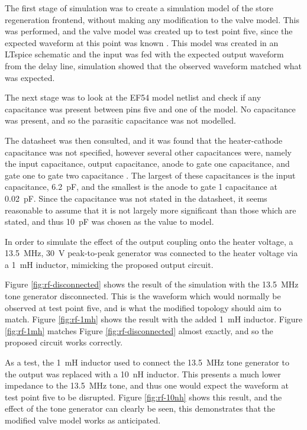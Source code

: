 The first stage of simulation was to create a simulation model of the store regeneration frontend, without making any modification to the valve model. This was performed, and the valve model was created up to test point five, since the expected waveform at this point was known \cite[p.3]{linnington2016b}. This model was created in an LTspice schematic and the input was fed with the expected output waveform from the delay line, simulation showed that the observed waveform matched what was expected.

The next stage was to look at the EF54 model netlist and check if any capacitance was present between pins five and one of the model. No capacitance was present, and so the parasitic capacitance was not modelled.

The datasheet was then consulted, and it was found that the heater-cathode capacitance was not specified, however several other capacitances were, namely the input capacitance, output capacitance, anode to gate one capacitance, and gate one to gate two capacitance \cite{mullardb}. The largest of these capacitances is the input capacitance, \SI{6.2}{\pico\farad}, and the smallest is the anode to gate 1 capacitance at \SI{0.02}{\pico\farad}. Since the capacitance was not stated in the datasheet, it seems reasonable to assume that it is not largely more significant than those which are stated, and thus \SI{10}{\pico\farad} was chosen as the value to model.

In order to simulate the effect of the output coupling onto the heater voltage, a \SI{13.5}{\mega\hertz}, \SI{30}{\volt} peak-to-peak generator was connected to the heater voltage via a \SI{1}{\milli\henry} inductor, mimicking the proposed output circuit.


Figure \ref{fig:rf-disconnected} shows the result of the simulation with the \SI{13.5}{\mega\hertz} tone generator disconnected. This is the waveform which would normally be observed at test point five, and is what the modified topology should aim to match. Figure \ref{fig:rf-1mh} shows the result with the added \SI{1}{\milli\henry} inductor. Figure \ref{fig:rf-1mh} matches Figure \ref{fig:rf-disconnected} almost exactly, and so the proposed circuit works correctly.

As a test, the \SI{1}{\milli\henry} inductor used to connect the \SI{13.5}{\mega\hertz} tone generator to the output was replaced with a \SI{10}{\nano\henry} inductor. This presents a much lower impedance to the \SI{13.5}{\mega\hertz} tone, and thus one would expect the waveform at test point five to be disrupted. Figure \ref{fig:rf-10nh} shows this result, and the effect of the tone generator can clearly be seen, this demonstrates that the modified valve model works as anticipated.

